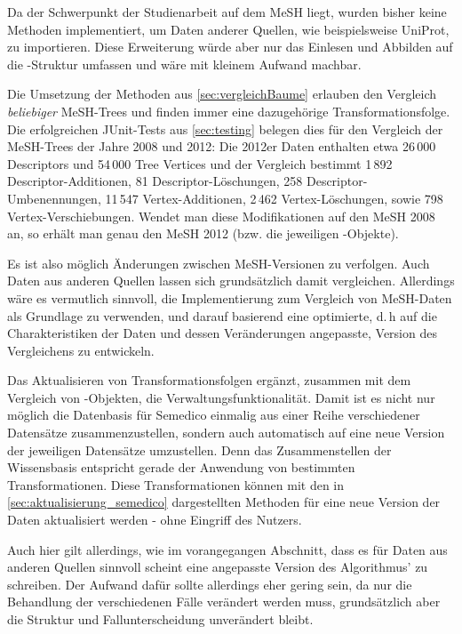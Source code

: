 Da der Schwerpunkt der Studienarbeit auf dem MeSH liegt, wurden bisher keine Methoden implementiert, um Daten anderer Quellen, wie beispielsweise UniProt, zu importieren. Diese Erweiterung würde aber nur das Einlesen und Abbilden auf die -Struktur umfassen und wäre mit kleinem Aufwand machbar. \par

Die Umsetzung der Methoden aus \autoref{sec:vergleichBaume} erlauben den Vergleich \textit{beliebiger} MeSH-Trees und finden immer eine dazugehörige Transformationsfolge. Die erfolgreichen JUnit-Tests aus \autoref{sec:testing} belegen dies für den Vergleich der MeSH-Trees der Jahre 2008 und 2012: Die 2012er Daten enthalten etwa 26\,000 Descriptors und 54\,000 Tree Vertices und der Vergleich bestimmt 1\,892 Descriptor-Additionen, 81 Descriptor-Löschungen, 258 Descriptor-Umbenennungen, 11\,547 Vertex-Additionen, 2\,462 Vertex-Löschungen, sowie 798 Vertex-Verschiebungen. Wendet man diese Modifikationen auf den MeSH 2008 an, so erhält man genau den MeSH 2012 (bzw. die jeweiligen -Objekte). \par

Es ist also möglich Änderungen zwischen MeSH-Versionen zu verfolgen. Auch Daten aus anderen Quellen lassen sich grundsätzlich damit vergleichen. Allerdings wäre es vermutlich sinnvoll, die Implementierung zum Vergleich von MeSH-Daten als Grundlage zu verwenden, und darauf basierend eine optimierte, d.\,h auf die Charakteristiken der Daten und dessen Veränderungen angepasste, Version des Vergleichens zu entwickeln. \par

Das Aktualisieren von Transformationsfolgen ergänzt, zusammen mit dem Vergleich von -Objekten, die Verwaltungsfunktionalität. Damit ist es nicht nur möglich die Datenbasis für Semedico einmalig aus einer Reihe verschiedener Datensätze zusammenzustellen, sondern auch automatisch auf eine neue Version der jeweiligen Datensätze umzustellen. Denn das Zusammenstellen der Wissensbasis entspricht gerade der Anwendung von bestimmten Transformationen. Diese Transformationen können mit den in \autoref{sec:aktualisierung_semedico} \textit{} dargestellten Methoden für eine neue Version der Daten aktualisiert werden - ohne Eingriff des Nutzers.\par

Auch hier gilt allerdings, wie im vorangegangen Abschnitt, dass es für Daten aus anderen Quellen sinnvoll scheint eine angepasste Version des Algorithmus' zu schreiben. Der Aufwand dafür sollte allerdings eher gering sein, da nur die Behandlung der verschiedenen Fälle verändert werden muss, grundsätzlich aber die Struktur und Fallunterscheidung unverändert bleibt. \par

